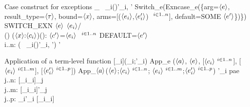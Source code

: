 \documentclass[12pt,twoside,fleqn]{article}
\begin{document}
 {Case construct for exceptions}
 {_\ctype\,\expression\,\,
    \expression_i\to(\evar)\expression'_i,
     \to \expression'}
 {Switch\_e(Exncase\_e(\{arg=$\langle{e}\rangle$,
                         result\_type=$\langle{\tau}\rangle$,
                         bound=$\langle{x}\rangle$,
                         arms=[($\langle{e_i}\rangle$,$\langle{e'_i}\rangle$)%
                                 $\ {}^{i\in 1..n}$],
                         default=SOME $\langle{e'}\rangle$\})\})}
 {SWITCH\_EXN $\langle{e}\rangle$
            $\langle{e_i}\rangle$/\\()%
              ($\langle{x}\rangle{:}\langle{c_i}\rangle$)(){:}%
              $\langle{c'}\rangle$=$\langle{e_i}\rangle$%
         $\ {}^{i\in 1..n}$
         DEFAULT=$\langle{e'}\rangle$}
 {}
 {\irule
   {\validexpression{\context}{\expression}{\cexn}\\
    \forall i..n:\quad{}}
   {\validexpression{\context}
    {(\,\expression\,\,
     \expression_i\to(\evar)\expression'_i,
       \to \expression')}
    {\constructor'}}
 } 


\newcommand{\eapplymil}[4]{{#1}[#2](#3;#4)}
 {Application of a term-level function}
 {\eapplymil{\expression}{\constructor_i}
         {\expression_i\super{i}{1..m}}{\expression'_i\super{i}{1..p}}}
 {App\_e ($\langle{a}\rangle$, 
             $\langle{e}\rangle$, 
        [$\langle{c_i}\rangle\ {}^{i\in 1..n}$],
        [$\langle{e_i}\rangle\ {}^{i\in 1..m}$],
        [$\langle{e'_i}\rangle\ {}^{i\in 1..p}$])}
 {App\_$\langle{a}\rangle$($\langle{e}\rangle$;$\langle{c_i}\rangle\ {}^{i\in 1..n}$;%
       $\langle{e_i}\rangle\ {}^{i\in 1..m}$;$\langle{e'_i}\rangle\ {}^{i\in 1..p}$)}
 {}
 {\irule
   {\validexpression{\context}{\expression}
       {
          {\ctype'_i}
          {p}{a}{e}{\constructor}}\\
    \forall j..n:\quad
          {[\cvar_i{\mapsto}\constructor_i]\kind_j}\\
    \forall j..m:\quad
          {[\cvar_i{\mapsto}\constructor_i]\ctype'_j}\\
    \forall j..p:\quad
        }
   {\validexpression{\context}
      {
         {\expression_i}{\expression'_i}}
      {[\cvar_i{\mapsto}\constructor_i]\kind}}
 }
\end{document}
